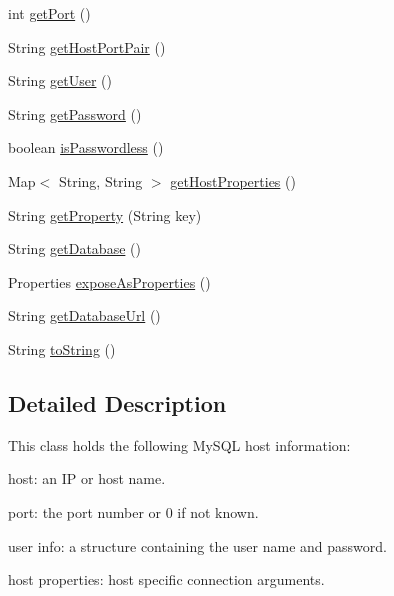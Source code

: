 \begin{DoxyCompactItemize}
int \mbox{\hyperlink{classcom_1_1mysql_1_1cj_1_1conf_1_1_host_info_af0c2b397e445567f8217eb989a9f4fbf}{get\+Port}} ()
\item 
String \mbox{\hyperlink{classcom_1_1mysql_1_1cj_1_1conf_1_1_host_info_a700c311c9f63a8f0031c15713ef92d6b}{get\+Host\+Port\+Pair}} ()
\item 
String \mbox{\hyperlink{classcom_1_1mysql_1_1cj_1_1conf_1_1_host_info_a5e80ba60a558bf41f970aa488f849c10}{get\+User}} ()
\item 
String \mbox{\hyperlink{classcom_1_1mysql_1_1cj_1_1conf_1_1_host_info_aebe3979385ac27249cae703ec4c5ea6c}{get\+Password}} ()
\item 
boolean \mbox{\hyperlink{classcom_1_1mysql_1_1cj_1_1conf_1_1_host_info_a6bb33f0cf17ac943b76138e3813898da}{is\+Passwordless}} ()
\item 
Map$<$ String, String $>$ \mbox{\hyperlink{classcom_1_1mysql_1_1cj_1_1conf_1_1_host_info_aac017e83698627d6cf91a8eb3b1f263b}{get\+Host\+Properties}} ()
\item 
String \mbox{\hyperlink{classcom_1_1mysql_1_1cj_1_1conf_1_1_host_info_ac8fc2bf397e189fe33af42d098220dd3}{get\+Property}} (String key)
\item 
String \mbox{\hyperlink{classcom_1_1mysql_1_1cj_1_1conf_1_1_host_info_aac3a26a2ad40c40bd6a2a8dfb4856a58}{get\+Database}} ()
\item 
Properties \mbox{\hyperlink{classcom_1_1mysql_1_1cj_1_1conf_1_1_host_info_aa316f9e75ff79e0db70ac527bbfe8cf3}{expose\+As\+Properties}} ()
\item 
String \mbox{\hyperlink{classcom_1_1mysql_1_1cj_1_1conf_1_1_host_info_a84c5d1cc48b3d5d1d9911513777f9152}{get\+Database\+Url}} ()
\item 
String \mbox{\hyperlink{classcom_1_1mysql_1_1cj_1_1conf_1_1_host_info_ac3d7e44e2787c35c23b99127865233c0}{to\+String}} ()
\end{DoxyCompactItemize}


\subsection{Detailed Description}
This class holds the following My\+S\+QL host information\+: 
\begin{DoxyItemize}
\item host\+: an IP or host name. 
\item port\+: the port number or 0 if not known. 
\item user info\+: a structure containing the user name and password. 
\item host properties\+: host specific connection arguments. 
\end{DoxyItemize}

